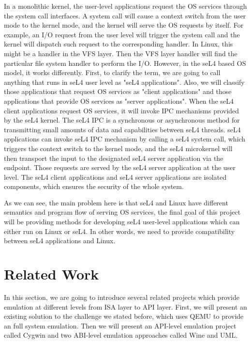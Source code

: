 In a monolithic kernel, the user-level applications request the OS services through the system call interfaces. A system call will cause a context switch from the user mode to the kernel mode, and the kernel will serve the OS requests by itself. For example, an I/O request from the user level will trigger the system call and the kernel will dispatch such request to the corresponding handler. In Linux, this might be a handler in the VFS layer. Then the VFS layer handler will find the particular file system handler to perform the I/O. However, in the seL4 based OS model, it works differently. First, to clarify the term, we are going to call anything that runs in seL4 user level as "seL4 applications". Also, we will classify those applications that request OS services as "client applications" and those applications that provide OS services as "server applications". When the seL4 client applications request OS services, it will invoke IPC mechanisms provided by the seL4 kernel. The seL4 IPC is a synchronous or asynchronous method for transmitting small amounts of data and capabilities between seL4 threads. seL4 applications can invoke seL4 IPC mechanism by calling a seL4 system call, which triggers the context switch to the kernel mode, and the seL4 microkernel will then transport the input to the designated seL4 server application via the endpoint. Those requests are served by the seL4 server application at the user level. The seL4 client applications and seL4 server applications are isolated components, which ensures the security of the whole system.

As we can see, the main problem here is that seL4 and Linux have different semantics and program flow of serving OS services, the final goal of this project will be providing methods for developing seL4 user-level applications which can either run on Linux or seL4. In other words, we need to provide compatibility between seL4 applications and Linux.

\section{Related Work}


In this section, we are going to introduce several related projects which provide emulation at different levels from ISA layer to API layer. First, we will present an existing solution to the challenge we stated before, which uses QEMU to provide an full system emulation. Then we will present an API-level emulation project called Cygwin and two ABI-level emulation approaches called Wine and UML. 

